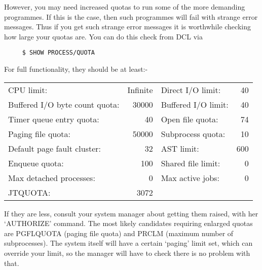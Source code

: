 However, you may need increased quotas to run some of the more demanding
programmes. If this is the case, then such programmes will fail with
strange error messages. Thus if you get such strange error messages it is
worthwhile checking how large your quotas are. You can do this check from
{\small DCL} via 

\begin{verbatim}
     $ SHOW PROCESS/QUOTA
\end{verbatim}

For full functionality, they should be at least:- 

\begin{tabular}[c]{lrlr}
\\
\hspace{4ex} CPU limit: & Infinite & \hspace{4ex} Direct I/O limit: & 40\\
\hspace{4ex} Buffered I/O byte count quota: & 30000 & \hspace{4ex} Buffered I/O limit: & 40\\
\hspace{4ex} Timer queue entry quota: & 40 & \hspace{4ex} Open file quota: & 74\\
\hspace{4ex} Paging file quota: & 50000 & \hspace{4ex} Subprocess quota: & 10\\
\hspace{4ex} Default page fault cluster: & 32 & \hspace{4ex} AST limit: & 600\\
\hspace{4ex} Enqueue quota: & 100 & \hspace{4ex} Shared file limit: & 0\\
\hspace{4ex} Max detached processes: & 0 & \hspace{4ex} Max active jobs: & 0\\
\hspace{4ex} JTQUOTA: & 3072 & & \\
\end{tabular}

If they are less, consult your system manager about getting them raised,
with her `AUTHORIZE' command. The most likely candidates requiring enlarged
quotas are PGFLQUOTA (paging file quota) and PRCLM (maximum number of
subprocesses). The system itself will have a certain `paging' limit set,
which can override your limit, so the manager will have to check there is
no problem with that. 


